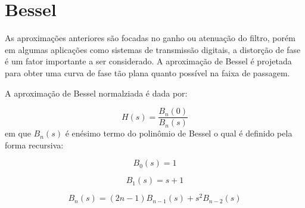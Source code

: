 \section{Bessel}

As aproximações anteriores são focadas no ganho ou atenuação do filtro, porém em algumas aplicações como sistemas de transmissão digitais, a distorção de fase é um fator importante a ser considerado. A aproximação de Bessel é projetada para obter uma curva de fase tão plana quanto possível na faixa de passagem.

A aproximação de Bessel normalziada é dada por:

\begin{equation}
    H(s) = \frac{B_n(0)}{B_n(s)}
\end{equation}
em que $B_n(s)$ é enésimo termo do polinômio de Bessel o qual é definido pela forma recursiva:

\begin{equation}
    B_0(s) = 1 
\end{equation}

\begin{equation}
    B_1(s) = s + 1
\end{equation}

\begin{equation}
    B_n(s) = (2n -1)B_{n-1}(s) + s^2B_{n-2}(s)
\end{equation}